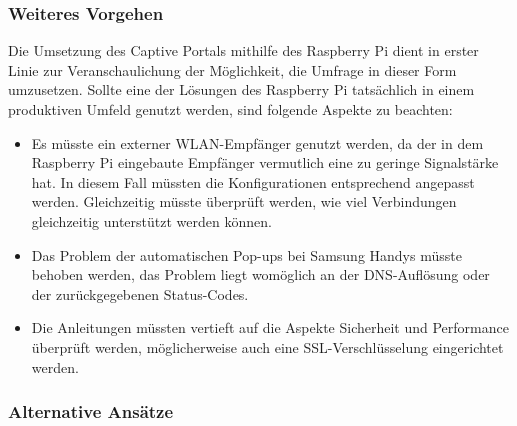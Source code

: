 \subsubsection*{Weiteres Vorgehen}
Die Umsetzung des Captive Portals mithilfe des Raspberry Pi dient in erster Linie zur Veranschaulichung der Möglichkeit, die Umfrage in dieser Form umzusetzen. Sollte eine der Lösungen des Raspberry Pi tatsächlich in einem produktiven Umfeld genutzt werden, sind folgende Aspekte zu beachten:
\begin{itemize}
\item Es müsste ein externer WLAN-Empfänger genutzt werden, da der in dem Raspberry Pi eingebaute Empfänger vermutlich eine zu geringe Signalstärke hat. In diesem Fall müssten die Konfigurationen entsprechend angepasst werden. Gleichzeitig müsste überprüft werden, wie viel Verbindungen gleichzeitig unterstützt werden können.
\item Das Problem der automatischen Pop-ups bei Samsung Handys müsste behoben werden, das Problem liegt womöglich an der DNS-Auflösung oder der zurückgegebenen Status-Codes.
\item Die Anleitungen müssten vertieft auf die Aspekte Sicherheit und Performance überprüft werden, möglicherweise auch eine SSL-Verschlüsselung eingerichtet werden.

\end{itemize}

\subsubsection{Alternative Ansätze}

